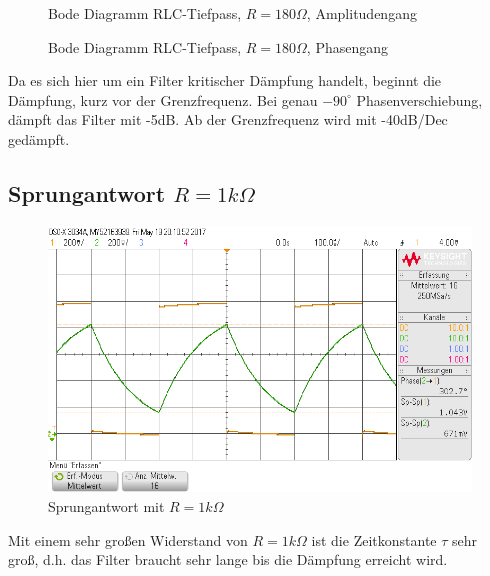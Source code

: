 \begin{figure}[H]
  \centering
  \caption{Bode Diagramm RLC-Tiefpass, $R=180\Omega$, Amplitudengang}
\end{figure}
\begin{figure}[H]
  \centering
  \caption{Bode Diagramm RLC-Tiefpass, $R=180\Omega$, Phasengang}
\end{figure}
Da es sich hier um ein Filter kritischer D\"ampfung handelt, beginnt die D\"ampfung, kurz vor der Grenzfrequenz. Bei genau $-90^\circ$ Phasenverschiebung, d\"ampft das Filter mit -5dB. Ab der Grenzfrequenz wird mit -40dB/Dec ged\"ampft.

\subsection{Sprungantwort $R=1k\Omega$}

\begin{figure}[H]
  \begin{center}
    \includegraphics[width=1\textwidth]{./Oszi_Bilder/RLC_Sprung_1k.png}
    \caption{Sprungantwort mit $R=1k\Omega$}
  \end{center}
\end{figure}
\noindent
Mit einem sehr gro\ss{}en Widerstand von $R=1k\Omega$ ist die Zeitkonstante $\tau$ sehr gro\ss{}, d.h. das Filter braucht sehr lange bis die D\"ampfung erreicht wird.

